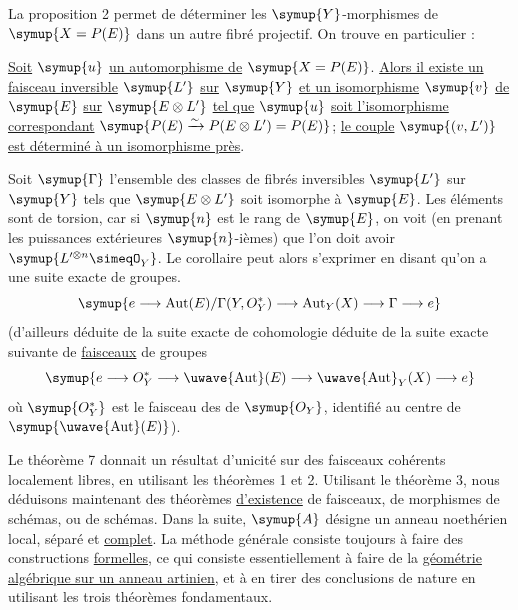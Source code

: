 La proposition 2 permet de déterminer les $\symup{Y}$-morphismes de $\symup{X=P(E)}$
dans un autre fibré projectif. On trouve en particulier :

 \uline{Soit} $\symup{u}$ \uline{un automorphisme de} $\symup{X=P(E)}$. \uline{Alors il
existe un faisceau inversible} $\symup{L'}$ \uline{sur} $\symup{Y}$ \uline{et un isomorphisme} $\symup{v}$ \uline{de} $\symup{E}$ \uline{sur}
$\symup{E\otimes L'}$ \uline{tel que} $\symup{u}$ \uline{soit l'isomorphisme correspondant}
$\symup{P(E)\xrightarrow{\sim}P(E\otimes L')=P(E)}$;
\uline{le couple} $\symup{(v,L')}$ \uline{est déterminé à un isomorphisme près}.

Soit $\symup{\Gamma}$ l'ensemble des classes de fibrés inversibles $\symup{L'}$ sur $\symup{Y}$ tels
que $\symup{E\otimes L'}$ soit isomorphe à $\symup{E}$. Les éléments sont de torsion, car si
$\symup{n}$ est le rang de $\symup{E}$, on voit (en prenant les puissances extérieures
$\symup{n}$-ièmes) que l'on doit avoir $\symup{L'^{\otimes n}\simeqO_Y}$. Le corollaire peut
alors s'exprimer en disant qu'on a une suite exacte de groupes.
\[
  \symup{e\longrightarrow
  \operatorname{Aut}(E)/\Gamma(Y,O_Y^*)
  \longrightarrow \operatorname{Aut}_Y(X)
  \longrightarrow \Gamma\longrightarrow e}
\]
(d'ailleurs déduite de la suite exacte de cohomologie déduite de la suite
exacte suivante de \uline{faisceaux} de groupes
\[
  \symup{e\longrightarrow O_Y^*
  \longrightarrow \mathop{\text{\uwave{Aut}}}\nolimits(E)
  \longrightarrow \mathop{\text{\uwave{Aut}}}\nolimits_Y(X)
  \longrightarrow e}
\]
où $\symup{O_Y^*}$ est le faisceau des  de $\symup{O_Y}$, identifié au centre
de $\symup{\mathop{\text{\uwave{Aut}}}\nolimits(E)}$).


Le théorème 7 donnait un résultat d'unicité sur des faisceaux cohérents
localement libres, en utilisant les théorèmes 1 et 2. Utilisant le théorème 3,
nous déduisons maintenant des théorèmes \uline{d'existence} de faisceaux, de morphismes
de schémas, ou de schémas. Dans la suite, $\symup{A}$ désigne un anneau noethérien
local, séparé et \uline{complet}. La méthode générale consiste toujours à faire des
constructions \uline{formelles}, ce qui consiste essentiellement à faire de la
\uline{géométrie algébrique sur un anneau artinien}, et à en tirer des conclusions de
nature  en utilisant les trois théorèmes fondamentaux.

